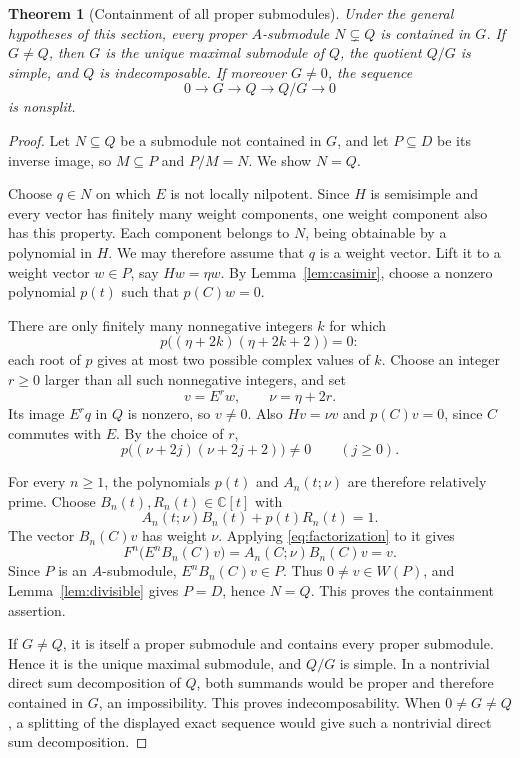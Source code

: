 \documentclass[11pt,a4paper]{article}
\newcommand{\C}{\mathbb C}
\theoremstyle{plainupright}
\newtheorem{theorem}{Theorem}[section]
\begin{document}
\begin{theorem}[Containment of all proper submodules]\label{thm:containment}
Under the general hypotheses of this section, every proper
\(A\)-submodule \(N\subsetneq Q\) is contained in \(G\).
If \(G\ne Q\), then \(G\) is the unique maximal submodule of \(Q\),
the quotient \(Q/G\) is simple, and \(Q\) is indecomposable.
If moreover \(G\ne0\), the sequence
\[
0\longrightarrow G\longrightarrow Q\longrightarrow Q/G
\longrightarrow0
\]
is nonsplit.
\end{theorem}
\begin{proof}
Let \(N\subseteq Q\) be a submodule not contained in \(G\), and let
\(P\subseteq D\) be its inverse image, so \(M\subseteq P\) and \(P/M=N\).
We show \(N=Q\).

Choose \(q\in N\) on which \(E\) is not locally nilpotent.
Since \(H\) is semisimple and every vector has finitely many weight
components, one weight component also has this property.
Each component belongs to \(N\), being obtainable by a polynomial
in \(H\). We may therefore assume that \(q\) is a weight vector.
Lift it to a weight vector \(w\in P\), say \(Hw=\eta w\).
By Lemma~\ref{lem:casimir}, choose a nonzero polynomial \(p(t)\)
such that \(p(C)w=0\).

There are only finitely many nonnegative integers \(k\) for which
\[
p\bigl((\eta+2k)(\eta+2k+2)\bigr)=0:
\]
each root of \(p\) gives at most two possible complex values of \(k\).
Choose an integer \(r\ge0\) larger than all such nonnegative integers,
and set
\[
v=E^rw,\qquad \nu=\eta+2r.
\]
Its image \(E^rq\) in \(Q\) is nonzero, so \(v\ne0\).
Also \(Hv=\nu v\) and \(p(C)v=0\), since \(C\) commutes with \(E\).
By the choice of \(r\),
\[
p\bigl((\nu+2j)(\nu+2j+2)\bigr)\ne0\qquad(j\ge0).
\]

For every \(n\ge1\), the polynomials \(p(t)\) and \(A_n(t;\nu)\)
are therefore relatively prime. Choose \(B_n(t),R_n(t)\in\C[t]\)
with
\[
A_n(t;\nu)B_n(t)+p(t)R_n(t)=1.
\]
The vector \(B_n(C)v\) has weight \(\nu\). Applying
\eqref{eq:factorization} to it gives
\[
F^n\bigl(E^nB_n(C)v\bigr)
=A_n(C;\nu)B_n(C)v=v.
\]
Since \(P\) is an \(A\)-submodule, \(E^nB_n(C)v\in P\).
Thus \(0\ne v\in W(P)\), and Lemma~\ref{lem:divisible} gives
\(P=D\), hence \(N=Q\).
This proves the containment assertion.

If \(G\ne Q\), it is itself a proper submodule and contains every
proper submodule. Hence it is the unique maximal submodule, and
\(Q/G\) is simple.
In a nontrivial direct sum decomposition of \(Q\), both summands
would be proper and therefore contained in \(G\), an impossibility.
This proves indecomposability.
When \(0\ne G\ne Q\), a splitting of the displayed exact sequence
would give such a nontrivial direct sum decomposition.
\end{proof}
\end{document}
